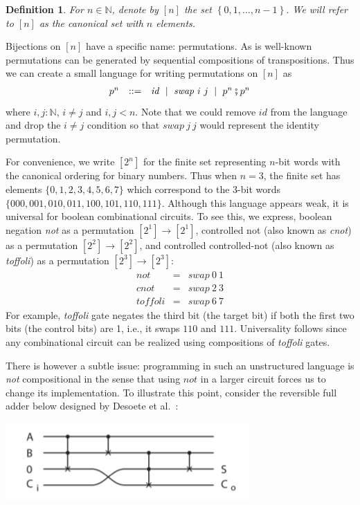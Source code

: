 \documentclass{article}
\newtheorem{defn}{Definition}[section]
\newcommand{\fin}[1]{\ensuremath{\left[#1\right]}}
\newcommand{\Nat}{\ensuremath{\mathbb{N}}}
\begin{document}
\begin{defn} For $n\in\Nat$, denote by $\fin{n}$ the set
$\left\{0,1,\ldots,n-1\right\}$.
We will refer to $\fin{n}$ as the canonical set with $n$ elements.
\end{defn}

Bijections on \fin{n} have a specific name: permutations. As is
well-known permutations can be generated by sequential compositions of
transpositions. Thus we can create a small language for writing
permutations on $\fin{n}$ as
\[\begin{array}{rcl}
p^n &::=& \mathit{id} ~\mid~ \mathit{swap}~i~j ~\mid~ p^n \fatsemi p^n
  \end{array}\]
where $i,j:\Nat$, $i\neq j$ and $i,j < n$. Note that we could remove
$\mathit{id}$ from the language and drop the $i\neq j$ condition so that
$\mathit{swap}~j~j$ would represent the identity permutation.

For convenience, we write $[2^n]$ for the finite set representing
$n$-bit words with the canonical ordering for binary numbers. Thus
when $n=3$, the finite set has elements $\{0,1,2,3,4,5,6,7\}$ which
correspond to the 3-bit words $\{000,001,010,011,100,101,110,111\}$.
Although this language appears weak, it is universal for boolean
combinational circuits. To see this, we express, boolean negation
\emph{not} as a permutation $[2^1] \rightarrow [2^1]$, controlled not
(also known as \emph{cnot}) as a permutation
$[2^2] \rightarrow [2^2]$, and controlled controlled-not (also known
as \emph{toffoli}) as a permutation $[2^3] \rightarrow [2^3]$:
\[\begin{array}{rcl}
\mathit{not} &=& \mathit{swap}~0~1 \\
\mathit{cnot} &=& \mathit{swap}~2~3 \\
\mathit{toffoli} &=& \mathit{swap}~6~7
\end{array}\]
For example, \emph{toffoli} gate negates the third bit (the target
bit) if both the first two bits (the control bits) are 1, i.e., it
swaps $110$ and $111$. Universality follows since any combinational
circuit can be realized using compositions of \emph{toffoli} gates.

There is however a subtle issue: programming in such an unstructured
language is \emph{not} compositional in the sense that using
$\mathit{not}$ in a larger circuit forces us to change its
implementation. To illustrate this point, consider the reversible full
adder below designed by Desoete et al.~\cite{117414}:

\begin{center}
\includegraphics[scale=0.6]{full-adder.png}
\end{center}
\end{document}
